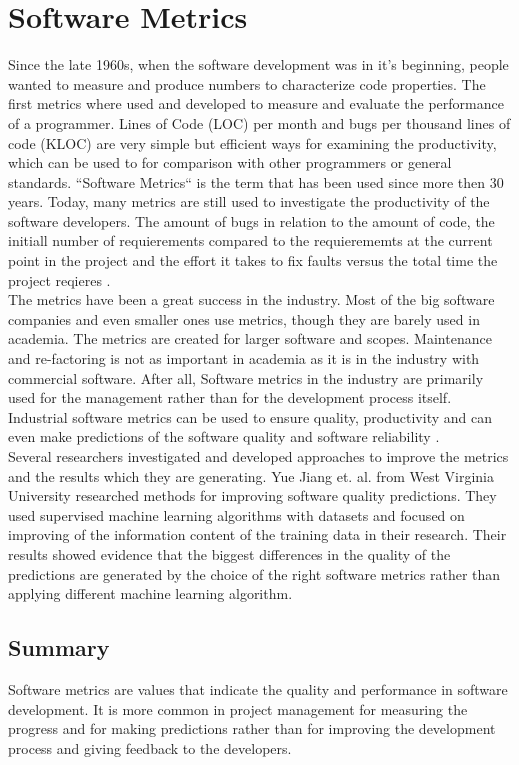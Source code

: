 \section{Software Metrics}
Since the late 1960s, when the software development was in it's beginning, people wanted to measure and produce numbers to characterize code properties. 
The first metrics where used and developed to measure and evaluate the performance of a programmer. Lines of Code (LOC) per month and bugs per thousand lines of code (KLOC) are very simple but efficient ways for examining the productivity, which can be used to for comparison with other programmers or general standards.
\bigbreak
``Software Metrics`` is the term that has been used since more then 30 years.
Today, many metrics are still used to investigate the productivity of the software developers. The amount of bugs in relation to the amount of code, the initiall number of requierements compared to the requierememts at the current point in the project and the effort it takes to fix faults versus the total time the project reqieres \cite{kaner2004software}.\\
The metrics have been a great success in the industry. Most of the big software companies and even smaller ones use metrics, though they are barely used in academia. 
The metrics are created for larger software and scopes. Maintenance and re-factoring is not as important in academia as it is in the industry with commercial software. After all, Software metrics in the industry are primarily used for the management rather than for the development process itself.\\
Industrial software metrics can be used to ensure quality, productivity and can even make predictions of the software quality and software reliability \cite{fenton1999software}.\\
Several researchers investigated and developed approaches to improve the metrics and the results which they are generating. 
Yue Jiang et. al. \cite{jiang2008comparing} from West Virginia University researched methods for improving software quality predictions. They used supervised machine learning algorithms with datasets and focused on improving of the information content of the training data in their research. Their results showed evidence that the biggest differences in the quality of the predictions are generated by the choice of the right software metrics rather than applying different machine learning algorithm. 

\subsection{Summary}
Software metrics are values that indicate the quality and performance in software development. It is more common in project management for measuring the progress and for making predictions rather than for improving the development process and giving feedback to the developers. 


